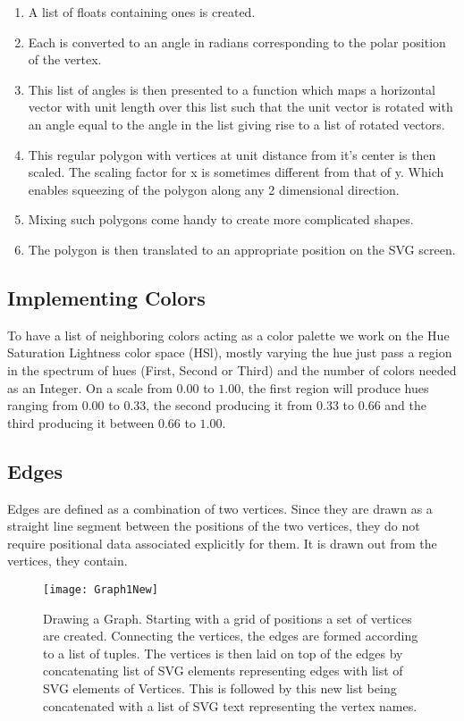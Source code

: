 \begin{enumerate}
\item A list of floats containing ones is created. 

\item Each is converted to an angle in radians corresponding
to the polar position of the vertex. 

\item This list of angles is then presented to
a function which maps a horizontal vector with unit length over this list
such that the unit vector is rotated with an angle equal to the angle in the
list giving rise to a list of rotated vectors.

\item This regular polygon with vertices at unit distance from it's center is
then scaled. The scaling factor for x is sometimes different from that of y.
Which enables squeezing of the polygon along any 2 dimensional direction.

\item Mixing such polygons come handy to create more complicated shapes.

\item The polygon is then translated to an appropriate position on the SVG screen.

\end{enumerate}

\subsection{Implementing Colors}
To have a list of neighboring colors acting as a color palette we work on the
Hue Saturation Lightness color space (HSl), mostly varying the hue just pass a
region in the spectrum of hues (First, Second or Third) and the number of
colors needed as an Integer. On a scale from $0.00$ to $1.00$, the first region
will produce hues ranging from $0.00$ to $0.33$, the second producing it from
$0.33$ to $0.66$ and the third producing it between $0.66$ to $1.00$.

\subsection{Edges}
Edges are defined as a combination of two vertices. Since they are drawn as a
straight line segment between the positions of the two vertices, they do not require
positional data associated explicitly for them. It is drawn out from the vertices,
they contain.

\begin{figure}[!ht]
\centering
\texttt{[image: Graph1New]}
\caption{
         Drawing a Graph. Starting with a grid of positions
         a set of vertices are created. Connecting the vertices,
         the edges are formed according to a list of tuples. The 
         vertices is then laid on top of the edges by concatenating list
         of SVG elements representing edges with list of SVG elements
         of Vertices. This is followed by this new list being concatenated
         with a list of SVG text representing the vertex names.
        }
\end{figure}

